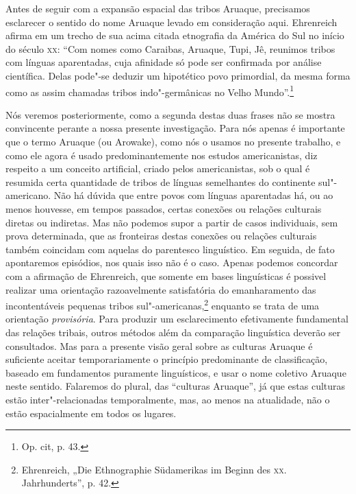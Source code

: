 Antes de seguir com a expansão espacial das tribos Aruaque, precisamos
esclarecer o sentido do nome Aruaque levado em consideração aqui.
Ehrenreich afirma em um trecho de sua acima citada etnografia da América
do Sul no início do século \textsc{xx}: ``Com nomes como Caraibas, Aruaque, Tupi,
Jê, reunimos tribos com línguas aparentadas, cuja afinidade só pode ser
confirmada por análise científica. Delas pode"-se deduzir um hipotético
povo primordial, da mesma forma como as assim chamadas tribos
indo"-germânicas no Velho Mundo''.\footnote{Op. cit, p. 43.}

Nós veremos posteriormente, como a segunda destas duas frases não se
mostra convincente perante a nossa presente investigação. Para nós
apenas é importante que o termo Aruaque (ou Arowake), como nós o usamos
no presente trabalho, e como ele agora é usado predominantemente nos
estudos americanistas, diz respeito a um conceito artificial, criado
pelos americanistas, sob o qual é resumida certa quantidade de tribos
de línguas semelhantes do continente sul"-americano. Não há dúvida que
entre povos com línguas aparentadas há, ou ao menos houvesse, em tempos
passados, certas conexões ou relações culturais diretas ou indiretas.
Mas não podemos supor a partir de casos individuais, sem prova
determinada, que as fronteiras destas conexões ou relações culturais
também coincidam com aquelas do parentesco linguístico. Em seguida, de
fato apontaremos episódios, nos quais isso não é o caso. Apenas podemos
concordar com a afirmação de Ehrenreich, que somente em bases
linguísticas é possivel realizar uma orientação razoavelmente
satisfatória do emanharamento das incontentáveis pequenas tribos
sul"-americanas,\footnote{Ehrenreich, „Die Ethnographie Südamerikas im
  Beginn des \textsc{xx}. Jahrhunderts'', p. 42.} enquanto se trata de uma
orientação \emph{provisória}. Para produzir um esclarecimento
efetivamente fundamental das relações tribais, outros métodos além da
comparação linguística deverão ser consultados. Mas para a presente
visão geral sobre as culturas Aruaque é suficiente aceitar
temporariamente o princípio predominante de classificação, baseado em
fundamentos puramente linguísticos, e usar o nome coletivo Aruaque neste
sentido. Falaremos do plural, das ``culturas Aruaque'', já que estas
culturas estão inter"-relacionadas temporalmente, mas, ao menos na
atualidade, não o estão espacialmente em todos os lugares.

